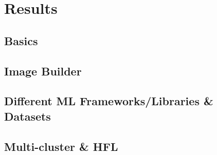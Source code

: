 \section{Results}

\subsection{Basics}

\subsection{Image Builder}

\subsection{Different ML Frameworks/Libraries \& Datasets}

\subsection{Multi-cluster \& HFL}